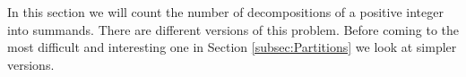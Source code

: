 

\setcounter{section}{3}
\setcounter{subsection}{0}
\setcounter{dfn}{0}

In this section we will count the number of decompositions of a positive integer into summands.
There are different versions of this problem.
Before coming to the most difficult and interesting one in Section \ref{subsec:Partitions} we look at simpler versions.





